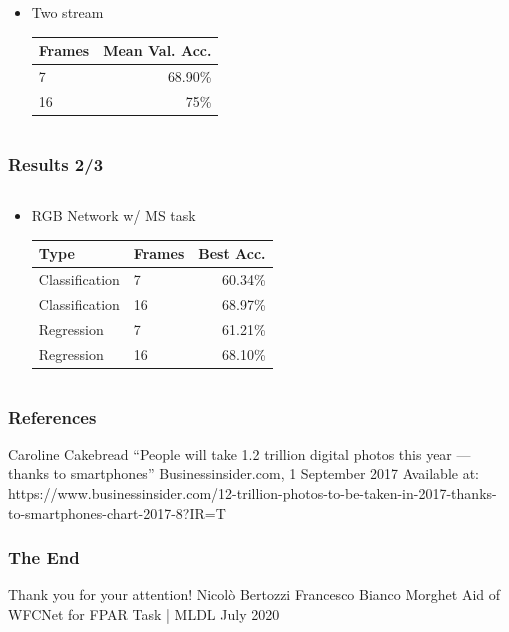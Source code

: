 \documentclass{beamer}
\begin{document}
\begin{frame}
{\begin{columns}[t]
\begin{column}{.7\textwidth}
			\end{column}
	\end{columns}
	\vspace{12pt}
	\begin{columns}[b]
		\begin{column}{.5\textwidth}
			\begin{itemize}
				\item Two stream \\
				\vspace*{8pt}
				\begin{tabular}{l|r}
					Frames & Mean Val. Acc. \\
					\hline
					7 & 68.90\% \\
					16 & 75\%
				\end{tabular}
			\end{itemize}
		\end{column}
		
	\end{columns}
	}

\end{frame}

\begin{frame}
	\frametitle{Results 2/3}
	
	{ \footnotesize 
	\begin{columns}
		\begin{column}{.75\textwidth}
			\begin{itemize}
				\item RGB Network w/ MS task
				\vspace{8pt}
				\begin{tabular}{ll|r}
					Type & Frames & Best Acc. \\
					\hline
					Classification & 7 & 60.34\% \\
					Classification & 16 & 68.97\% \\
					Regression & 7 & 61.21\% \\
					Regression & 16 & 68.10\% \\
				\end{tabular}
			\end{itemize}
		\end{column}
	\end{columns}
	}
	
\end{frame}
     
\begin{frame}
\frametitle{References}
   \begin{thebibliography}{9}
		Caroline Cakebread
		\newblock “People will take 1.2 trillion digital photos this year — thanks to smartphones”
		\newblock Businessinsider.com, 1 September 2017
		\newblock Available at: https://www.businessinsider.com/12-trillion-photos-to-be-taken-in-2017-thanks-to-smartphones-chart-2017-8?IR=T
   \end{thebibliography}
\end{frame}

\begin{frame}
\centering
\frametitle{The End}
\Huge Thank you for your attention!
\break
\break
\break
\break
\large Nicolò Bertozzi
\break
Francesco Bianco Morghet
\break
\break
Aid of WFCNet for FPAR Task | MLDL
 July 2020
\end{frame}
\end{document}
